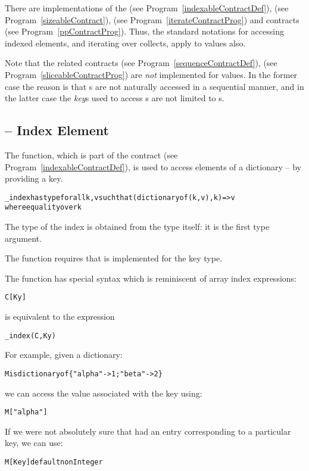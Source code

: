 There are implementations of the  (see Program~\vref{indexableContractDef}),  (see Program~\vref{sizeableContract}),  (see Program~\vref{iterateContractProg}) and  contracts (see Program~\vref{ppContractProg}). Thus, the standard notations for accessing indexed elements, and iterating over collects, apply to  values also.

Note that the related contracts  (see Program~\vref{sequenceContractDef}),  (see Program~\vref{sliceableContractProg}) are \emph{not} implemented for  values. In the former case the reason is that s are not naturally accessed in a sequential manner, and in the latter case the \emph{key}s used to access s are not limited to s.

\subsection{ -- Index Element}
\label{indexMapFunction}
The  function, which is part of the  contract (see Program~\vref{indexableContractDef}), is used to access elements of a dictionary -- by providing a key.
\begin{alltt}
_index has type for all k,v such that (dictionary of (k,v),k)=>v
                where equality over k
\end{alltt}
\begin{aside}
The type of the index is obtained from the  type itself: it is the first type argument.
\end{aside}

\begin{aside}
The  function requires that  is implemented for the key type.
\end{aside}

\noindent
The  function has special syntax which is reminiscent of array index expressions:
\begin{alltt}
C[Ky]
\end{alltt}
is equivalent to the expression
\begin{alltt}
\_index(C,Ky)
\end{alltt}
For example, given a dictionary:
\begin{alltt}
M is dictionary of \{ "alpha"->1; "beta"->2 \}
\end{alltt}
we can access the value associated with the key  using:
\begin{alltt}
M["alpha"]
\end{alltt}
If we were not absolutely sure that  had an entry corresponding to a particular key, we can use:
\begin{alltt}
M[Key] default nonInteger
\end{alltt}

